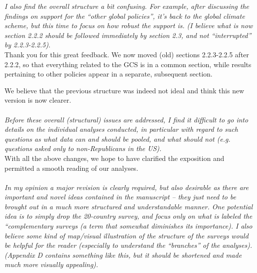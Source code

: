 \documentclass[12pt,english]{article}
\begin{document}
\textit{I also find the overall structure a bit confusing. For example, after discussing the findings on support for the “other global policies”, it’s back to the global climate scheme, but this time to focus on how robust the support is. (I believe what is now section 2.2.2 should be followed immediately by section 2.3, and not “interrupted” by 2.2.3-2.2.5).}~\\

Thank you for this great feedback. We now moved (old) sections 2.2.3-2.2.5 after 2.2.2, so that everything related to the GCS is in a common section, while results pertaining to other policies appear in a separate, subsequent section. 

We believe that the previous structure was indeed not ideal and think this new version is now clearer. 
~\\ ~\\


\textit{Before these overall (structural) issues are addressed, I find it difficult to go into details on the individual analyses conducted, in particular with regard to such questions as what data can and should be pooled, and what should not (e.g. questions asked only to non-Republicans in the US).}~\\

With all the above changes, we hope to have clarified the exposition and permitted a smooth reading of our analyses.
~\\ ~\\

\textit{In my opinion a major revision is clearly required, but also desirable as there are important and novel ideas contained in the manuscript – they just need to be brought out in a much more structured and understandable manner. One potential idea is to simply drop the 20-country survey, and focus only on what is labeled the “complementary surveys (a term that somewhat diminishes its importance). I also believe some kind of map/visual illustration of the structure of the surveys would be helpful for the reader (especially to understand the “branches” of the analyses). (Appendix D contains something like this, but it should be shortened and made much more visually appealing).}~\\
\end{document}
